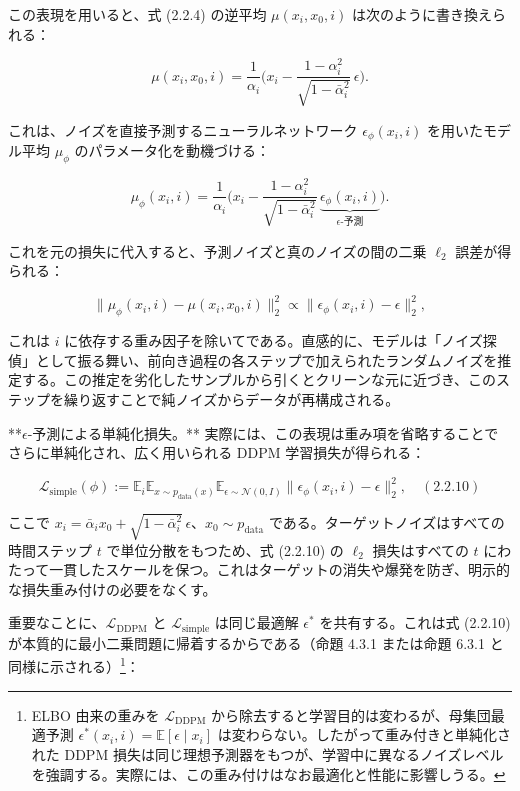 この表現を用いると、式 (2.2.4) の逆平均 $\mu(x_i,x_0,i)$ は次のように書き換えられる：

\[
\mu(x_i,x_0,i) = \frac{1}{\alpha_i}\Biggl(x_i - \frac{1-\alpha_i^2}{\sqrt{1-\bar{\alpha}_i^2}}\,\epsilon\Biggr).
\]


これは、ノイズを直接予測するニューラルネットワーク $\epsilon_\phi(x_i,i)$ を用いたモデル平均 $\mu_\phi$ のパラメータ化を動機づける：

\[
\mu_\phi(x_i,i) = \frac{1}{\alpha_i}\Biggl(x_i - \frac{1-\alpha_i^2}{\sqrt{1-\bar{\alpha}_i^2}}\,\underbrace{\epsilon_\phi(x_i,i)}_{\epsilon\text{-予測}}\Biggr).
\]


これを元の損失に代入すると、予測ノイズと真のノイズの間の二乗 $\ell_2$ 誤差が得られる：

\[
\bigl\|\mu_\phi(x_i,i)-\mu(x_i,x_0,i)\bigr\|_2^2 \propto \bigl\|\epsilon_\phi(x_i,i)-\epsilon\bigr\|_2^2,
\]


これは $i$ に依存する重み因子を除いてである。直感的に、モデルは「ノイズ探偵」として振る舞い、前向き過程の各ステップで加えられたランダムノイズを推定する。この推定を劣化したサンプルから引くとクリーンな元に近づき、このステップを繰り返すことで純ノイズからデータが再構成される。

**$\epsilon$-予測による単純化損失。** 実際には、この表現は重み項を省略することでさらに単純化され、広く用いられる DDPM 学習損失が得られる：

\[
\mathcal{L}_{\mathrm{simple}}(\phi) := \mathbb{E}_{i}\mathbb{E}_{x\sim p_{\mathrm{data}}(x)}\mathbb{E}_{\epsilon\sim\mathcal{N}(0,I)}\bigl\|\epsilon_\phi(x_i,i)-\epsilon\bigr\|_2^2, \quad (2.2.10)
\]


ここで $x_i = \bar{\alpha}_i x_0 + \sqrt{1-\bar{\alpha}_i^2}\,\epsilon$、$x_0\sim p_{\mathrm{data}}$ である。ターゲットノイズはすべての時間ステップ $t$ で単位分散をもつため、式 (2.2.10) の $\ell_2$ 損失はすべての $t$ にわたって一貫したスケールを保つ。これはターゲットの消失や爆発を防ぎ、明示的な損失重み付けの必要をなくす。

重要なことに、$\mathcal{L}_{\mathrm{DDPM}}$ と $\mathcal{L}_{\mathrm{simple}}$ は同じ最適解 $\epsilon^*$ を共有する。これは式 (2.2.10) が本質的に最小二乗問題に帰着するからである（命題 4.3.1 または命題 6.3.1 と同様に示される）\footnote{ELBO 由来の重みを $\mathcal{L}_{\mathrm{DDPM}}$ から除去すると学習目的は変わるが、母集団最適予測 $\epsilon^*(x_i,i)=\mathbb{E}[\epsilon\mid x_i]$ は変わらない。したがって重み付きと単純化された DDPM 損失は同じ理想予測器をもつが、学習中に異なるノイズレベルを強調する。実際には、この重み付けはなお最適化と性能に影響しうる。}：

